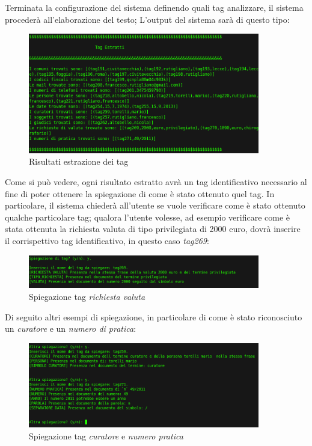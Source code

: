 Terminata la configurazione del sistema definendo quali tag analizzare, il sistema procederà all'elaborazione del testo; L'output del sistema sarà di questo tipo:
\begin{figure}[H]
	\centering
	\includegraphics[width=0.9\textwidth]{img/interfaces/CLI-result.png}
	\caption[Schermata CLI result]{Risultati estrazione dei tag}
	\label{CLI-result}
\end{figure}

Come si può vedere, ogni risultato estratto avrà un tag identificativo necessario al fine di poter ottenere la spiegazione di come è stato ottenuto quel tag. In particolare, il sistema chiederà all'utente se vuole verificare come è stato ottenuto qualche particolare tag; qualora l'utente volesse, ad esempio verificare come è stata ottenuta la richiesta valuta di tipo privilegiata di 2000 euro, dovrà inserire il corrispettivo tag identificativo, in questo caso \emph{tag269}:

\begin{figure}[H]
	\centering
	\includegraphics[width=0.9\textwidth]{img/interfaces/CLI-spiegazioneRich.png}
	\caption[Schermata CLI spiegazione]{Spiegazione tag \emph{richiesta valuta}}
	\label{CLI-spiegaRichiesta}
\end{figure}

Di seguito altri esempi di spiegazione, in particolare di come è stato riconosciuto un \emph{curatore} e un \emph{numero di pratica}:
\begin{figure}[H]
	\centering
	\includegraphics[width=0.9\textwidth]{img/interfaces/CLI-spiegazione.png}
	\caption[Schermata CLI altre spiegazioni]{Spiegazione tag \emph{curatore} e \emph{numero pratica}}
	\label{CLI-spiega}
\end{figure}
\clearpage